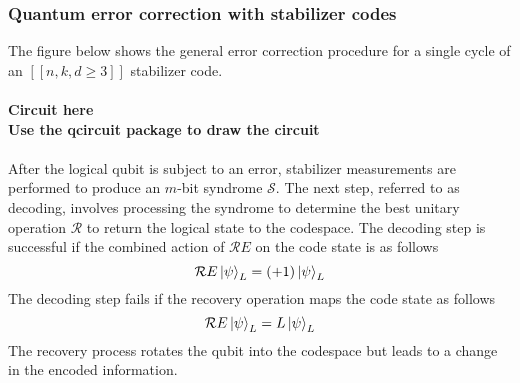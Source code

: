 \subsubsection{Quantum error correction with stabilizer codes}

The figure below shows the general error correction procedure for a single cycle of an $[[n,k,d \geq 3]]$ stabilizer code.
\\
\\
\textbf{Circuit here}
\\
\textbf{Use the qcircuit package to draw the circuit}
\\
\\
After the logical qubit is subject to an error, stabilizer measurements are performed to produce an $m$-bit syndrome $\mathcal{S}$. The next step, referred to as decoding, involves processing the syndrome to determine the best unitary operation $\mathcal{R}$ to return the logical state to the codespace. The decoding step is successful if the combined action of $\mathcal{R}E$ on the code state is as follows
\[
    \mathcal{R}E \ket{\psi}_L = (+1) \ket{\psi}_L
\]
The decoding step fails if the recovery operation maps the code state as follows
\[
    \mathcal{R}E \ket{\psi}_L = L \ket{\psi}_L
\]
The recovery process rotates the qubit into the codespace but leads to a change in the encoded information.
